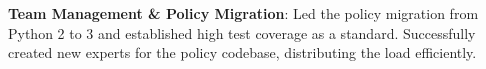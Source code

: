 \documentclass[letterpaper,11pt]{article}
\newcommand{\resumeItem}[2]{
  \item\small{
    \textbf{#1}{: #2 \vspace{-2pt}}
  }
}
\begin{document}
          \resumeItem{Team Management \& Policy Migration}
            {Led the policy migration from Python 2 to 3 and established high test coverage as a standard. Successfully created new experts for the policy codebase, distributing the load efficiently.}
\end{document}
